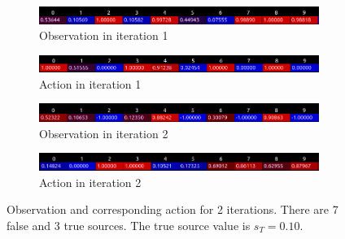 \documentclass[11pt, a4paper]{article}
\begin{document}
\begin{figure}[h]
	\begin{subfigure}{\textwidth}
		\centering
		\includegraphics[width=.85\linewidth]{3t7f_obs_iter1_hc.png}  
		\caption{Observation in iteration 1}
		\label{fig:3t7f_obs_iter1}
	\end{subfigure}
	\begin{subfigure}{\textwidth}
		\centering
		\includegraphics[width=.85\linewidth]{3t7f_action_iter1_hc.png}  
		\caption{Action in iteration 1}
		\label{fig:3t7f_action_iter1}
	\end{subfigure}
	\begin{subfigure}{\textwidth}
		\centering
		\includegraphics[width=.85\linewidth]{3t7f_obs_iter2_hc.png}  
		\caption{Observation in iteration 2}
		\label{fig:3t7f_obs_iter2}
	\end{subfigure}
	\begin{subfigure}{\textwidth}
		\centering
		\includegraphics[width=.85\linewidth]{3t7f_action_iter2_hc.png}  
		\caption{Action in iteration 2}
		\label{fig:3t7f_action_iter2}
	\end{subfigure}
	\caption{\label{fig:act-obs_3t7f}Observation and corresponding action for 2 iterations. There are 7 false and 3 true sources. The true source value is $s_T=0.10$.}
\end{figure}
\end{document}
